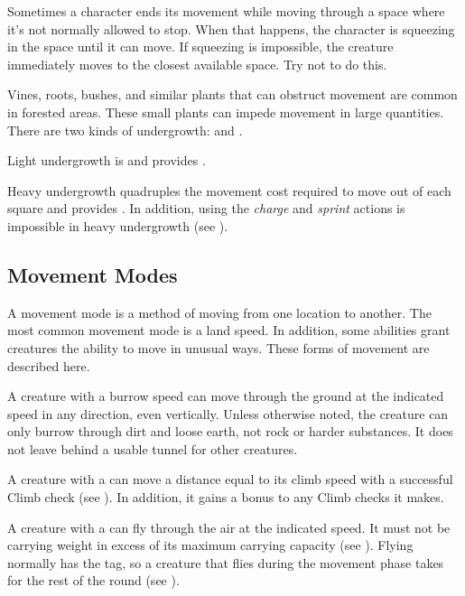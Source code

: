          Sometimes a character ends its movement while moving through a space where it's not normally allowed to stop. When that happens, the character is squeezing in the space until it can move. If squeezing is impossible, the creature immediately moves to the closest available space. Try not to do this.

        \label{Undergrowth} Vines, roots, bushes, and similar plants that can obstruct movement are common in forested areas.
        These small plants can impede movement in large quantities.
        There are two kinds of undergrowth:  and .

        \label{Light Undergrowth}
        Light undergrowth is  and provides .

        \label{Heavy Undergrowth}
        Heavy undergrowth quadruples the movement cost required to move out of each square and provides .
        In addition, using the \textit{charge} and \textit{sprint} actions is impossible in heavy undergrowth (see ).

    \subsection{Movement Modes}\label{Movement Modes}
        A movement mode is a method of moving from one location to another.
        The most common movement mode is a land speed.
        In addition, some abilities grant creatures the ability to move in unusual ways.
        These forms of movement are described here.

        A creature with a burrow speed can move through the ground at the indicated speed in any direction, even vertically. Unless otherwise noted, the creature can only burrow through dirt and loose earth, not rock or harder substances. It does not leave behind a usable tunnel for other creatures.

        A creature with a  can move a distance equal to its climb speed with a successful Climb check (see ).
        In addition, it gains a  bonus to any Climb checks it makes.

        \label{Flying}
        A creature with a  can fly through the air at the indicated speed.
        It must not be carrying weight in excess of its maximum carrying capacity (see ).
        Flying normally has the  tag, so a creature that flies during the movement phase takes  for the rest of the round (see ).

